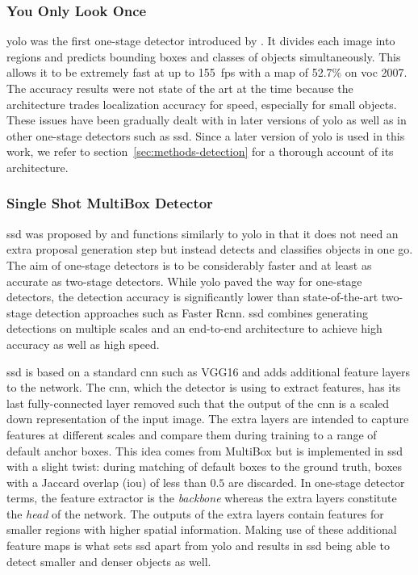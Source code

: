 \documentclass[final]{vutinfth} %
\begin{document}
\subsubsection{You Only Look Once}
\label{sssec:theory-yolo}

\gls{yolo} was the first one-stage detector introduced by
\textcite{redmon2016}. It divides each image into regions and predicts
bounding boxes and classes of objects simultaneously. This allows it
to be extremely fast at up to \qty{155}{fps} with a \gls{map} of
52.7\% on \gls{voc} 2007. The accuracy results were not state of the
art at the time because the architecture trades localization accuracy
for speed, especially for small objects. These issues have been
gradually dealt with in later versions of \gls{yolo} as well as in
other one-stage detectors such as \gls{ssd}. Since a later version of
\gls{yolo} is used in this work, we refer to
section~\ref{sec:methods-detection} for a thorough account of its
architecture.

\subsubsection{Single Shot MultiBox Detector}
\label{sssec:theory-ssd}

\gls{ssd} was proposed by \textcite{liu2016} and functions similarly
to \gls{yolo} in that it does not need an extra proposal generation
step but instead detects and classifies objects in one go. The aim of
one-stage detectors is to be considerably faster and at least as
accurate as two-stage detectors. While \gls{yolo} paved the way for
one-stage detectors, the detection accuracy is significantly lower
than state-of-the-art two-stage detection approaches such as Faster
R\gls{cnn}. \gls{ssd} combines generating detections on multiple
scales and an end-to-end architecture to achieve high accuracy as well
as high speed.

\gls{ssd} is based on a standard \gls{cnn} such as VGG16
\cite{liu2015} and adds additional feature layers to the network. The
\gls{cnn}, which the detector is using to extract features, has its
last fully-connected layer removed such that the output of the
\gls{cnn} is a scaled down representation of the input image. The
extra layers are intended to capture features at different scales and
compare them during training to a range of default anchor boxes. This
idea comes from MultiBox \cite{erhan2014} but is implemented in
\gls{ssd} with a slight twist: during matching of default boxes to the
ground truth, boxes with a Jaccard overlap (\gls{iou}) of less than
$0.5$ are discarded. In one-stage detector terms, the feature
extractor is the \emph{backbone} whereas the extra layers constitute
the \emph{head} of the network. The outputs of the extra layers
contain features for smaller regions with higher spatial
information. Making use of these additional feature maps is what sets
\gls{ssd} apart from \gls{yolo} and results in \gls{ssd} being able to
detect smaller and denser objects as well.
\end{document}
